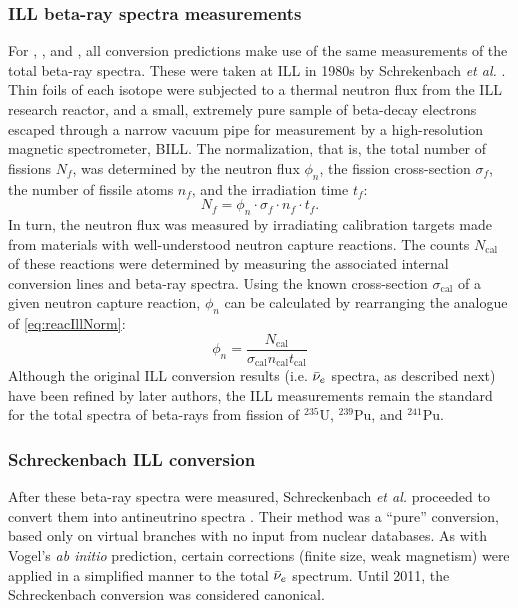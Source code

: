 \documentclass[../thesis.tex]{subfiles}
\begin{document}
\subsubsection{ILL beta-ray spectra measurements}
\label{sec:illmeas}

For \urfive, \punine, and \puone, all conversion predictions make use of the same measurements of the total beta-ray spectra. These were taken at ILL in 1980s by Schrekenbach \emph{et al.} \cite{SCHRECKENBACH1981251,VONFEILITZSCH1982162,SCHRECKENBACH1985325,HAHN1989365}. Thin foils of each isotope were subjected to a thermal neutron flux from the ILL research reactor, and a small, extremely pure sample of beta-decay electrons escaped through a narrow vacuum pipe for measurement by a high-resolution magnetic spectrometer, BILL.
The normalization, that is, the total number of fissions $N_f$, was determined by the neutron flux $\phi_n$, the fission cross-section $\sigma_f$, the number of fissile atoms $n_f$, and the irradiation time $t_f$:
\begin{equation}
  \label{eq:reacIllNorm}
  N_f = \phi_n \cdot \sigma_f \cdot n_f \cdot t_f.
\end{equation}
In turn, the neutron flux was measured by irradiating calibration targets made from materials with well-understood neutron capture reactions. The counts $N_{\mathrm{cal}}$ of these reactions were determined by measuring the associated internal conversion lines and beta-ray spectra. Using the known cross-section $\sigma_{\mathrm{cal}}$ of a given neutron capture reaction, $\phi_n$ can be calculated by rearranging the analogue of \autoref{eq:reacIllNorm}:
\begin{equation}
  \phi_n = \frac{N_{\mathrm{cal}}}{\sigma_{\mathrm{cal}} n_{\mathrm{cal}} t_{\mathrm{cal}}}
\end{equation}
Although the original ILL conversion results (i.e. $\bar\nu_e$ spectra, as described next) have been refined by later authors, the ILL measurements remain the standard for the total spectra of beta-rays from fission of $^{235}$U, $^{239}$Pu, and $^{241}$Pu.

\subsubsection{Schreckenbach ILL conversion}
\label{sec:schreck}

After these beta-ray spectra were measured, Schreckenbach \emph{et al.} proceeded to convert them into antineutrino spectra \cite{SCHRECKENBACH1981251,VONFEILITZSCH1982162,SCHRECKENBACH1985325,HAHN1989365}. Their method was a ``pure'' conversion, based only on virtual branches with no input from nuclear databases. As with Vogel's \ureight \emph{ab initio} prediction, certain corrections (finite size, weak magnetism) were applied in a simplified manner to the total $\bar\nu_e$ spectrum. Until 2011, the Schreckenbach conversion was considered canonical.
\end{document}

